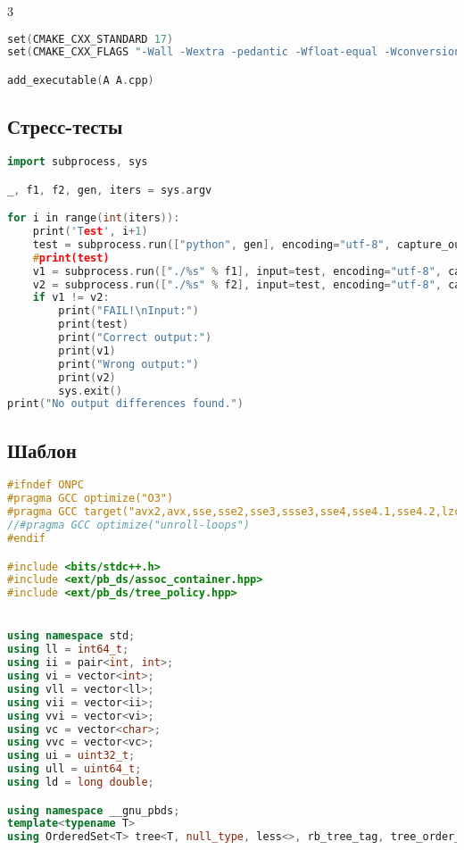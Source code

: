 \documentclass[10pt,a4paper,landscape,twosided]{extarticle}
\begin{document}
\begin{multicols}{3}
\begin{lstlisting}[language=C++]
set(CMAKE_CXX_STANDARD 17)
set(CMAKE_CXX_FLAGS "-Wall -Wextra -pedantic -Wfloat-equal -Wconversion -Wlogical-op -Wshift-overflow=2 -fsanitize=address,undefined,signed-integer-overflow,pointer-compare,pointer-subtract,shadow-call-stack,leak,bounds,pointer-overflow -fno-sanitize-recover -D_GLIBCXX_DEBUG -D_GLIBCXX_DEBUG_PEDANTIC -DONPC")

add_executable(A A.cpp)
\end{lstlisting}

\subsection{Стресс-тесты}
\begin{lstlisting}[language=C++]
import subprocess, sys

_, f1, f2, gen, iters = sys.argv

for i in range(int(iters)):
    print('Test', i+1)
    test = subprocess.run(["python", gen], encoding="utf-8", capture_output=True).stdout
    #print(test)
    v1 = subprocess.run(["./%s" % f1], input=test, encoding="utf-8", capture_output=True).stdout
    v2 = subprocess.run(["./%s" % f2], input=test, encoding="utf-8", capture_output=True).stdout
    if v1 != v2:
        print("FAIL!\nInput:")
        print(test)
        print("Correct output:")
        print(v1)
        print("Wrong output:")
        print(v2)
        sys.exit()
print("No output differences found.")
\end{lstlisting}

\subsection{Шаблон}
\begin{lstlisting}[language=C++]
#ifndef ONPC
#pragma GCC optimize("O3")
#pragma GCC target("avx2,avx,sse,sse2,sse3,ssse3,sse4,sse4.1,sse4.2,lzcnt")
//#pragma GCC optimize("unroll-loops")
#endif

#include <bits/stdc++.h>
#include <ext/pb_ds/assoc_container.hpp>
#include <ext/pb_ds/tree_policy.hpp>


using namespace std;
using ll = int64_t;
using ii = pair<int, int>;
using vi = vector<int>;
using vll = vector<ll>;
using vii = vector<ii>;
using vvi = vector<vi>;
using vc = vector<char>;
using vvc = vector<vc>;
using ui = uint32_t;
using ull = uint64_t;
using ld = long double;

using namespace __gnu_pbds;
template<typename T>
using OrderedSet<T> tree<T, null_type, less<>, rb_tree_tag, tree_order_statistics_node_update>;


\end{lstlisting}
\end{multicols}
\end{document}

